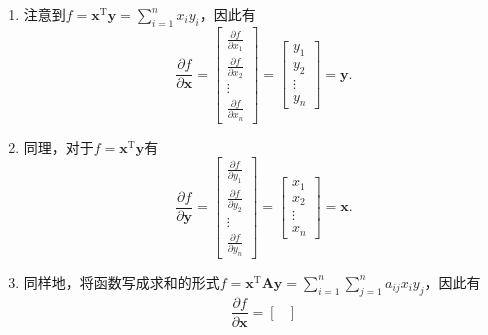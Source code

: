 \begin{solution}
    \begin{enumerate}
        \item 注意到\( f = \bm{x}^{\mathrm{T}} \bm{y}  = \sum_{i=1}^{n} x_i y_i\)，因此有
              \[
                  \frac{\partial f}{\partial \bm{x}} =
                  \begin{bmatrix}
                      \frac{\partial f}{\partial x_1} \\
                      \frac{\partial f}{\partial x_2} \\
                      \vdots                          \\
                      \frac{\partial f}{\partial x_n}
                  \end{bmatrix} =
                  \begin{bmatrix}
                      y_1    \\
                      y_2    \\
                      \vdots \\
                      y_n
                  \end{bmatrix} = \bm{y}.
              \]
        \item 同理，对于\( f = \bm{x}^{\mathrm{T}} \bm{y}  \)有
              \[
                  \frac{\partial f}{\partial \bm{y}} =
                  \begin{bmatrix}
                      \frac{\partial f}{\partial y_1} \\
                      \frac{\partial f}{\partial y_2} \\
                      \vdots                          \\
                      \frac{\partial f}{\partial y_n}
                  \end{bmatrix} =
                  \begin{bmatrix}
                      x_1    \\
                      x_2    \\
                      \vdots \\
                      x_n
                  \end{bmatrix} = \bm{x}.
              \]
        \item 同样地，将函数写成求和的形式\( f = \bm{x}^{\mathrm{T}} \mathbf{A} \bm{y} = \sum_{i=1}^{n} \sum_{j=1}^{n} a_{ij} x_i  y_j \)，因此有
              \[
                  \frac{\partial f}{\partial \bm{x}} =
                  \begin{bmatrix}

\end{bmatrix}\]
\end{enumerate}
\end{solution}

